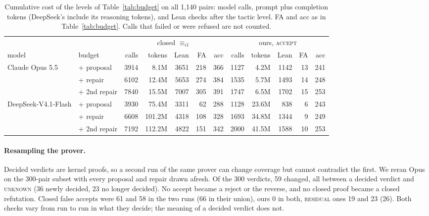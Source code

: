 \documentclass[10pt]{article}
\theoremstyle{definition}
\newcommand{\Ecl}{\mathrel{\equiv_{\mathrm{cl}}}}
\newcommand{\V}[1]{\textsc{#1}}
\begin{document}
\begin{table}[t]
\centering\small
\begin{tabular}{llrrrrrrrrrr}
\toprule
& & \multicolumn{5}{c}{closed $\Ecl$} & \multicolumn{5}{c}{ours, \V{accept}}\\
\cmidrule(lr){3-7}\cmidrule(lr){8-12}
model & budget & calls & tokens & Lean & FA & acc & calls & tokens & Lean & FA & acc\\
\midrule
Claude Opus 5.5 & + proposal & 3914 & 8.1M & 3651 & 218 & 366 & 1127 & 4.2M & 1142 & 13 & 241\\
 & + repair & 6102 & 12.4M & 5653 & 274 & 384 & 1535 & 5.7M & 1493 & 14 & 248\\
 & + 2nd repair & 7840 & 15.5M & 7007 & 305 & 391 & 1747 & 6.5M & 1702 & 15 & 253\\
DeepSeek-V4.1-Flash & + proposal & 3930 & 75.4M & 3311 & 62 & 288 & 1128 & 23.6M & 838 & 6 & 243\\
 & + repair & 6608 & 101.2M & 4318 & 108 & 328 & 1693 & 34.8M & 1344 & 9 & 249\\
 & + 2nd repair & 7192 & 112.2M & 4822 & 151 & 342 & 2000 & 41.5M & 1588 & 10 & 253\\
\bottomrule
\end{tabular}
\caption{Cumulative cost of the levels of Table~\ref{tab:budget} on all 1,140 pairs: model calls,
prompt plus completion tokens (DeepSeek's include its reasoning tokens), and Lean checks after
the tactic level. FA and acc as in Table~\ref{tab:budget}. Calls that failed or were refused are
not counted.}
\label{tab:cost}
\end{table}

\paragraph{Resampling the prover.} Decided verdicts are kernel proofs, so a second run of the same
prover can change coverage but cannot contradict the first. We reran Opus on the 300-pair subset
with every proposal and repair drawn afresh. Of the 300 verdicts, 59 changed, all between a
decided verdict and \V{unknown} (36 newly decided, 23 no longer decided). No accept became a
reject or the reverse, and no closed proof became a closed refutation. Closed false accepts were
61 and 58 in the two runs (66 in their union), ours 0 in both, \V{residual} ones 19 and 23 (26). Both
checks vary from run to run in what they decide; the meaning of a decided verdict does not.

\end{document}
